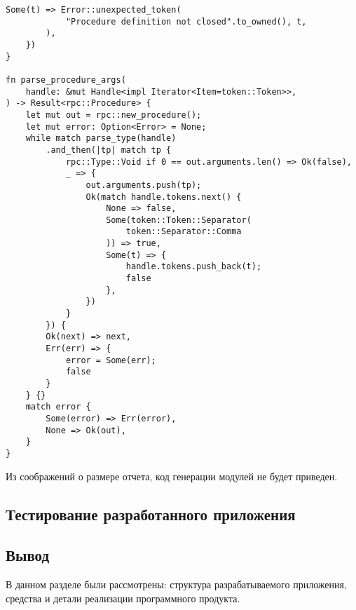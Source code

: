 \begin{lstlisting}[caption={Разбор процедуры (часть 2)}, label={lst:rust_parser_procedure2}]
        Some(t) => Error::unexpected_token(
            "Procedure definition not closed".to_owned(), t,
        ),
    })
}

fn parse_procedure_args(
    handle: &mut Handle<impl Iterator<Item=token::Token>>,
) -> Result<rpc::Procedure> {
    let mut out = rpc::new_procedure();
    let mut error: Option<Error> = None;
    while match parse_type(handle)
        .and_then(|tp| match tp {
            rpc::Type::Void if 0 == out.arguments.len() => Ok(false),
            _ => {
                out.arguments.push(tp);
                Ok(match handle.tokens.next() {
                    None => false,
                    Some(token::Token::Separator(
                        token::Separator::Comma
                    )) => true,
                    Some(t) => {
                        handle.tokens.push_back(t);
                        false
                    },
                })
            }
        }) {
        Ok(next) => next,
        Err(err) => {
            error = Some(err);
            false
        }
    } {}
    match error {
        Some(error) => Err(error),
        None => Ok(out),
    }
}
\end{lstlisting}

Из соображений о размере отчета, код генерации модулей не будет приведен.

\subsection{Тестирование разработанного приложения}

\subsection*{Вывод}

В данном разделе были рассмотрены: структура разрабатываемого приложения,
средства и детали реализации программного продукта.

